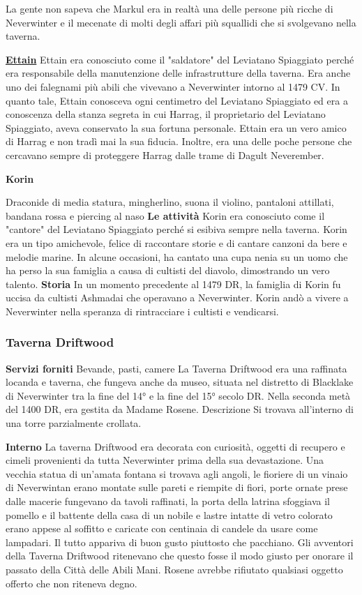 \documentclass{article}
\begin{document}
La gente non sapeva che Markul era in realtà una delle persone più ricche di Neverwinter e il mecenate di molti degli affari più squallidi che si svolgevano nella taverna.\newline\newline

\hyperlink{et}{\textbf{Ettain}}
Ettain era conosciuto come il "saldatore" del Leviatano Spiaggiato perché era responsabile della manutenzione delle infrastrutture della taverna. Era anche uno dei falegnami più abili che vivevano a Neverwinter intorno al 1479 CV.
In quanto tale, Ettain conosceva ogni centimetro del Leviatano Spiaggiato ed era a conoscenza della stanza segreta in cui Harrag, il proprietario del Leviatano Spiaggiato, aveva conservato la sua fortuna personale. Ettain era un vero amico di Harrag e non tradì mai la sua fiducia. Inoltre, era una delle poche persone che cercavano sempre di proteggere Harrag dalle trame di Dagult Neverember.
\newline

\hypertarget{kor}{\textbf{Korin}}
Draconide di media statura, mingherlino, suona il violino, pantaloni attillati, bandana rossa e piercing al naso
\textbf{Le attività}
Korin era conosciuto come il "cantore" del Leviatano Spiaggiato perché si esibiva sempre nella taverna. Korin era un tipo amichevole, felice di raccontare storie e di cantare canzoni da bere e melodie marine. In alcune occasioni, ha cantato una cupa nenia su un uomo che ha perso la sua famiglia a causa di cultisti del diavolo, dimostrando un vero talento.
\textbf{Storia}
In un momento precedente al 1479 DR, la famiglia di Korin fu uccisa da cultisti Ashmadai che operavano a Neverwinter. Korin andò a vivere a Neverwinter nella speranza di rintracciare i cultisti e vendicarsi.

\subsubsection{Taverna Driftwood}

\textbf{Servizi forniti}
Bevande, pasti, camere
La Taverna Driftwood era una raffinata locanda e taverna, che fungeva anche da museo, situata nel distretto di Blacklake di Neverwinter tra la fine del 14° e la fine del 15° secolo DR. Nella seconda metà del 1400 DR, era gestita da Madame Rosene.
Descrizione
Si trovava all'interno di una torre parzialmente crollata.


\textbf{Interno}
La taverna Driftwood era decorata con curiosità, oggetti di recupero e cimeli provenienti da tutta Neverwinter prima della sua devastazione. Una vecchia statua di un'amata fontana si trovava agli angoli, le fioriere di un vinaio di Neverwintan erano montate sulle pareti e riempite di fiori, porte ornate prese dalle macerie fungevano da tavoli raffinati, la porta della latrina sfoggiava il pomello e il battente della casa di un nobile e lastre intatte di vetro colorato erano appese al soffitto e caricate con centinaia di candele da usare come lampadari. Il tutto appariva di buon gusto piuttosto che pacchiano. Gli avventori della Taverna Driftwood ritenevano che questo fosse il modo giusto per onorare il passato della Città delle Abili Mani. Rosene avrebbe rifiutato qualsiasi oggetto offerto che non riteneva degno.
\end{document}
